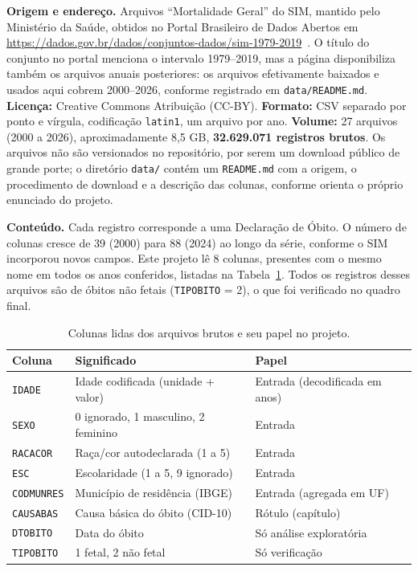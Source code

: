 \documentclass[12pt]{article}
\begin{document}
\textbf{Origem e endereço.} Arquivos ``Mortalidade Geral'' do SIM, mantido
pelo Ministério da Saúde, obtidos no Portal Brasileiro de Dados Abertos em
\url{https://dados.gov.br/dados/conjuntos-dados/sim-1979-2019}~\cite{sim_dadosgov}.
O título do conjunto no portal menciona o intervalo 1979--2019, mas a página
disponibiliza também os arquivos anuais posteriores: os arquivos efetivamente
baixados e usados aqui cobrem 2000--2026, conforme registrado em
\texttt{data/README.md}.
\textbf{Licença:} Creative Commons Atribuição (CC-BY). \textbf{Formato:} CSV
separado por ponto e vírgula, codificação \texttt{latin1}, um arquivo por ano.
\textbf{Volume:} 27 arquivos (2000 a 2026), aproximadamente 8,5 GB,
\textbf{32.629.071 registros brutos}. Os arquivos não são versionados no
repositório, por serem um download público de grande porte; o diretório
\texttt{data/} contém um \texttt{README.md} com a origem, o procedimento de
download e a descrição das colunas, conforme orienta o próprio enunciado do
projeto.

\textbf{Conteúdo.} Cada registro corresponde a uma Declaração de Óbito. O
número de colunas cresce de 39 (2000) para 88 (2024) ao longo da série,
conforme o SIM incorporou novos campos. Este projeto lê 8 colunas, presentes
com o mesmo nome em todos os anos conferidos, listadas na
Tabela~\ref{tab:colunas}. Todos os registros desses arquivos são de óbitos
não fetais (\texttt{TIPOBITO} = 2), o que foi verificado no quadro final.

\begin{table}[ht]
\centering
\caption{Colunas lidas dos arquivos brutos e seu papel no projeto.}
\label{tab:colunas}
\begin{tabular}{|l|l|l|}
\hline
\textbf{Coluna} & \textbf{Significado} & \textbf{Papel} \\
\hline
\texttt{IDADE} & Idade codificada (unidade + valor) & Entrada (decodificada em anos) \\
\texttt{SEXO} & 0 ignorado, 1 masculino, 2 feminino & Entrada \\
\texttt{RACACOR} & Raça/cor autodeclarada (1 a 5) & Entrada \\
\texttt{ESC} & Escolaridade (1 a 5, 9 ignorado) & Entrada \\
\texttt{CODMUNRES} & Município de residência (IBGE) & Entrada (agregada em UF) \\
\texttt{CAUSABAS} & Causa básica do óbito (CID-10) & Rótulo (capítulo) \\
\texttt{DTOBITO} & Data do óbito & Só análise exploratória \\
\texttt{TIPOBITO} & 1 fetal, 2 não fetal & Só verificação \\
\hline
\end{tabular}
\end{table}
\end{document}
